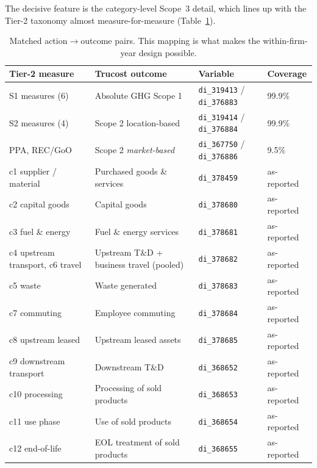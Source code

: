 \documentclass[11pt]{article}
\newcommand{\code}[1]{\texttt{\small #1}}
\begin{document}
The decisive feature is the category-level Scope~3 detail, which lines up with
the Tier-2 taxonomy almost measure-for-measure (Table~\ref{tab:map}).

\begin{table}[t]
\centering
\small
\caption{Matched action$\rightarrow$outcome pairs. This mapping is what makes the
within-firm-year design possible.}
\label{tab:map}
\begin{tabular}{@{}llll@{}}
\toprule
\textbf{Tier-2 measure} & \textbf{Trucost outcome} & \textbf{Variable} & \textbf{Coverage} \\
\midrule
S1 measures (6)            & Absolute GHG Scope 1                & \code{di\_319413} / \code{di\_376883} & 99.9\% \\
S2 measures (4)            & Scope 2 location-based              & \code{di\_319414} / \code{di\_376884} & 99.9\% \\
\quad PPA, REC/GoO         & Scope 2 \emph{market-based}         & \code{di\_367750} / \code{di\_376886} & 9.5\% \\
c1 supplier / material     & Purchased goods \& services         & \code{di\_378459} & as-reported \\
c2 capital goods           & Capital goods                       & \code{di\_378680} & as-reported \\
c3 fuel \& energy          & Fuel \& energy services             & \code{di\_378681} & as-reported \\
c4 upstream transport, c6 travel & Upstream T\&D + business travel (pooled) & \code{di\_378682} & as-reported \\
c5 waste                   & Waste generated                     & \code{di\_378683} & as-reported \\
c7 commuting               & Employee commuting                  & \code{di\_378684} & as-reported \\
c8 upstream leased         & Upstream leased assets              & \code{di\_378685} & as-reported \\
c9 downstream transport    & Downstream T\&D                     & \code{di\_368652} & as-reported \\
c10 processing             & Processing of sold products         & \code{di\_368653} & as-reported \\
c11 use phase              & Use of sold products                & \code{di\_368654} & as-reported \\
c12 end-of-life            & EOL treatment of sold products      & \code{di\_368655} & as-reported \\

\end{tabular}
\end{table}
\end{document}
